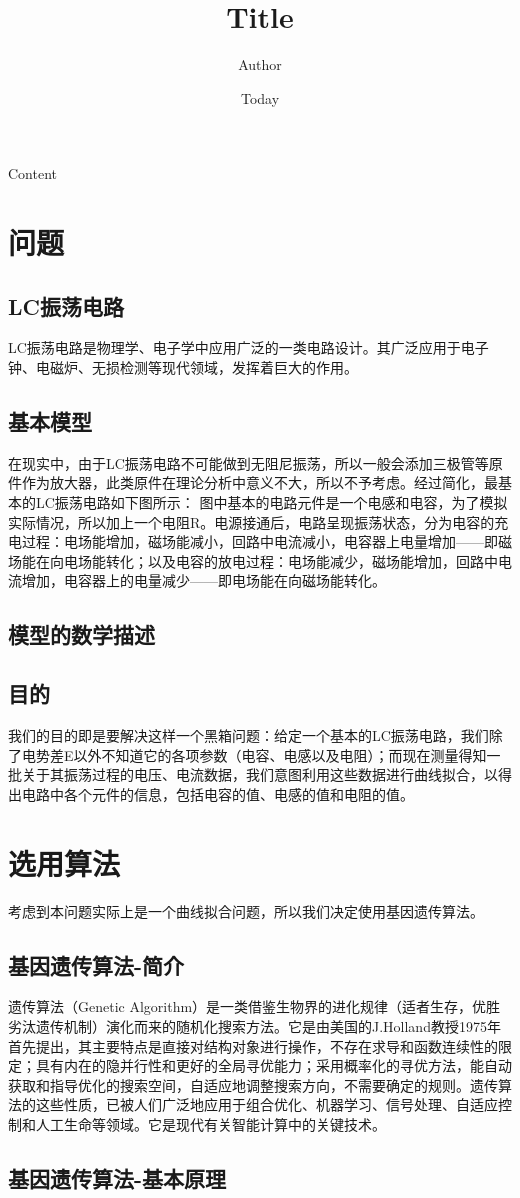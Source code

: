 \documentclass[]{article}
\begin{document}
\title{Title}
\author{Author}
\date{Today}
\maketitle

Content
\section{问题}
\subsection{LC振荡电路}
LC振荡电路是物理学、电子学中应用广泛的一类电路设计。其广泛应用于电子钟、电磁炉、无损检测等现代领域，发挥着巨大的作用。
\subsection{基本模型}
在现实中，由于LC振荡电路不可能做到无阻尼振荡，所以一般会添加三极管等原件作为放大器，此类原件在理论分析中意义不大，所以不予考虑。经过简化，最基本的LC振荡电路如下图所示：
图中基本的电路元件是一个电感和电容，为了模拟实际情况，所以加上一个电阻R。电源接通后，电路呈现振荡状态，分为电容的充电过程：电场能增加，磁场能减小，回路中电流减小，电容器上电量增加——即磁场能在向电场能转化；以及电容的放电过程：电场能减少，磁场能增加，回路中电流增加，电容器上的电量减少——即电场能在向磁场能转化。
\subsection{模型的数学描述}
\subsection{目的}
我们的目的即是要解决这样一个黑箱问题：给定一个基本的LC振荡电路，我们除了电势差E以外不知道它的各项参数（电容、电感以及电阻）；而现在测量得知一批关于其振荡过程的电压、电流数据，我们意图利用这些数据进行曲线拟合，以得出电路中各个元件的信息，包括电容的值、电感的值和电阻的值。

\section{选用算法}
考虑到本问题实际上是一个曲线拟合问题，所以我们决定使用基因遗传算法。
\subsection{基因遗传算法-简介}
遗传算法（Genetic Algorithm）是一类借鉴生物界的进化规律（适者生存，优胜劣汰遗传机制）演化而来的随机化搜索方法。它是由美国的J.Holland教授1975年首先提出，其主要特点是直接对结构对象进行操作，不存在求导和函数连续性的限定；具有内在的隐并行性和更好的全局寻优能力；采用概率化的寻优方法，能自动获取和指导优化的搜索空间，自适应地调整搜索方向，不需要确定的规则。遗传算法的这些性质，已被人们广泛地应用于组合优化、机器学习、信号处理、自适应控制和人工生命等领域。它是现代有关智能计算中的关键技术。
\subsection{基因遗传算法-基本原理}

\section{}
\end{document}
